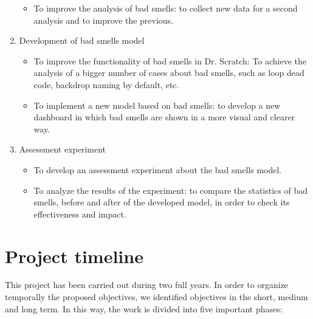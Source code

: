 \begin{enumerate}
\begin{itemize}
        \item To improve the analysis of bad smells: to collect new data for a second analysis and to improve the previous.
    \end{itemize}
    \item Development of bad smells model
    \begin{itemize}
        \item To improve the functionality of bad smells in Dr. Scratch: To achieve the analysis of a bigger number of cases about bad smells, such as loop dead code, backdrop naming by default, etc.
        \item To implement a new model based on bad smells: to develop a new dashboard in which bad smells are shown in a more visual and clearer way.
    \end{itemize}
    \item Assessment experiment
    \begin{itemize}
        \item To develop an assessment experiment about the bad smells model.
        \item To analyze the results of the experiment: to compare the statistics of bad smells, before and after of the developed model, in order to check its effectiveness and impact.
    \end{itemize}
\end{enumerate}



\section{Project timeline}
\label{sec:timeline-project}

This project has been carried out during two full years. In order to organize temporally the proposed objectives, we identified objectives in the short, medium and long term. In this way, the work is divided into five important phases:

